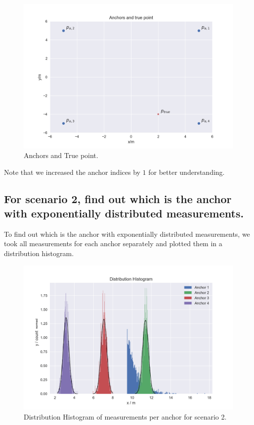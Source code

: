 \begin{figure}[H]
	\centering
\includegraphics[width=14cm]{anchors_and_true_point.png}
	\caption{Anchors and True point.}
	\label{fig1:points}
\end{figure}

Note that we increased the anchor indices by $1$ for better understanding.

\subsection{For scenario 2, find out which is the anchor with exponentially distributed measurements.}
To find out which is the anchor with exponentially distributed measurements, we took all measurements for each anchor separately and plotted them in a distribution histogram.

\begin{figure}[H]
	\centering
\includegraphics[width=14cm]{histogram.png}
	\caption{Distribution Histogram of measurements per anchor for scenario 2.}
	\label{fig1:histogram}
\end{figure}

